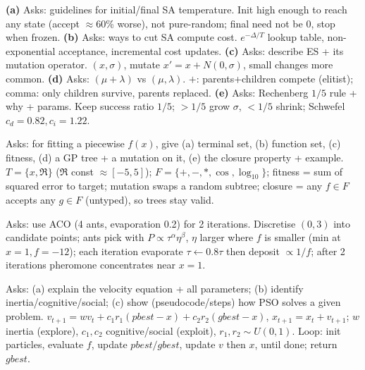 \textbf{(a)} Asks: guidelines for initial/final SA temperature. Init high enough to reach any state (accept \(\approx\)60\% worse), not pure-random; final need not be 0, stop when frozen. \textbf{(b)} Asks: ways to cut SA compute cost. \(e^{-\Delta/T}\) lookup table, non-exponential acceptance, incremental cost updates. \textbf{(c)} Asks: describe ES + its mutation operator. \((x,\sigma)\), mutate \(x'=x+N(0,\sigma)\), small changes more common. \textbf{(d)} Asks: \((\mu{+}\lambda)\) vs \((\mu,\lambda)\). \(+\): parents+children compete (elitist); comma: only children survive, parents replaced. \textbf{(e)} Asks: Rechenberg \(1/5\) rule + why + params. Keep success ratio \(1/5\); \(>\!1/5\) grow \(\sigma\), \(<\!1/5\) shrink; Schwefel \(c_d{=}0.82,c_i{=}1.22\).

Asks: for fitting a piecewise \(f(x)\), give (a) terminal set, (b) function set, (c) fitness, (d) a GP tree + a mutation on it, (e) the closure property + example. \(T=\{x,\Re\}\) (\(\Re\) const \(\approx[-5,5]\)); \(F=\{+,-,\ast,\cos,\log_{10}\}\); fitness = sum of squared error to target; mutation swaps a random subtree; closure = any \(f\in F\) accepts any \(g\in F\) (untyped), so trees stay valid.

Asks: use ACO (4 ants, evaporation 0.2) for 2 iterations. Discretise \((0,3)\) into candidate points; ants pick with \(P\propto\tau^{\alpha}\eta^{\beta}\), \(\eta\) larger where \(f\) is smaller (min at \(x{=}1,f{=}{-}12\)); each iteration evaporate \(\tau\!\leftarrow\!0.8\tau\) then deposit \(\propto1/f\); after 2 iterations pheromone concentrates near \(x{=}1\).

Asks: (a) explain the velocity equation + all parameters; (b) identify inertia/cognitive/social; (c) show (pseudocode/steps) how PSO solves a given problem. \(v_{t+1}=wv_t+c_1r_1(pbest{-}x)+c_2r_2(gbest{-}x)\), \(x_{t+1}=x_t{+}v_{t+1}\); \(w\) inertia (explore), \(c_1,c_2\) cognitive/social (exploit), \(r_1,r_2\sim U(0,1)\). Loop: init particles, evaluate \(f\), update \(pbest/gbest\), update \(v\) then \(x\), until done; return \(gbest\).
